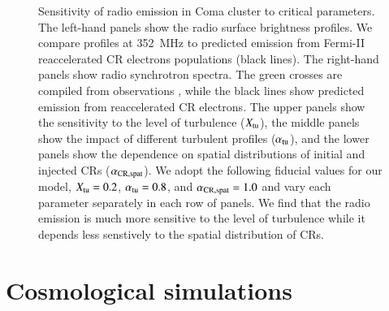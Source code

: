 \documentclass[fleqn,usenatbib,useAMS]{mnras}
\begin{document}
\begin{figure}
\caption{Sensitivity of radio emission in Coma cluster to critical
  parameters. The left-hand panels show the radio surface brightness
  profiles. We compare profiles at 352~MHz \citep[blue
    crosses,][]{brown11} to predicted emission from Fermi-II
  reaccelerated CR electrons populations (black lines). The right-hand
  panels show radio synchrotron spectra. The green crosses are
  compiled from observations \citep{2010PhDT.......259P}, while the
  black lines show predicted emission from reaccelerated CR
  electrons. The upper panels show the sensitivity to the level of
  turbulence ($X_{\mathrm{tu}}$), the middle panels show the impact of
  different turbulent profiles ($\alpha_{\mathrm{tu}}$), and the lower
  panels show the dependence on spatial distributions of initial and
  injected CRs ($\alpha_{\mathrm{CR,spat}}$). We adopt the following
  fiducial values for our model, $X_{\mathrm{tu}}=0.2$,
  $\alpha_{\mathrm{tu}}=0.8$, and $\alpha_{\mathrm{CR,spat}}=1.0$ and vary each
  parameter separately in each row of panels. We find that the radio
  emission is much more sensitive to the level of turbulence while it
  depends less senstively to the spatial distribution of CRs.}
  \label{fig:param_comp}
\end{figure}


\section{Cosmological simulations}
\label{sec:results}
\end{document}
